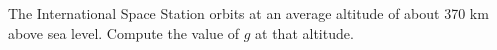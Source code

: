 The International Space Station orbits at an average altitude of about
370 km above sea level. Compute the value of $g$ at that altitude.\answercheck
